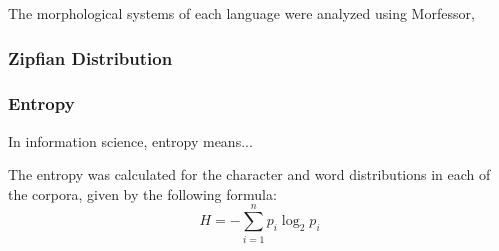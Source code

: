 \documentclass[12pt,a4paper]{article}
\numberwithin{figure}{section}
\numberwithin{table}{section}
\numberwithin{definition}{section}
\begin{document}

The morphological systems of each language were analyzed using Morfessor, 

\subsubsection{Zipfian Distribution}


\subsubsection{Entropy}
\label{ssec:entropy}

In information science, entropy means... 


The entropy was calculated for the character and word distributions in each of the corpora, given by the following formula: \[H = -\sum_{i=1}^{n}p_{i}\log_{2}p_{i}\]
\end{document}
